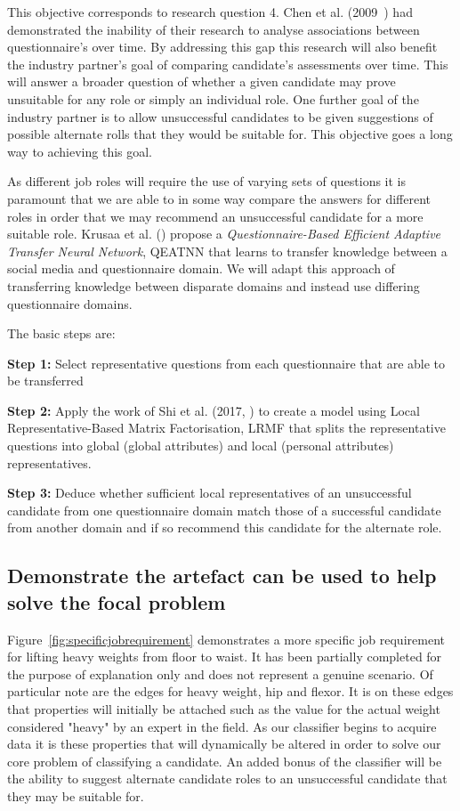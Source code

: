 This objective corresponds to research question 4. Chen et al. (2009~\cite{chen2009mining}) had demonstrated the inability of their research to analyse associations between questionnaire's over time. By addressing this gap this research will also benefit the industry partner's goal of comparing candidate's assessments over time. This will answer a broader question of whether a given candidate may prove unsuitable for any role or simply an individual role. One further goal of the industry partner is to allow unsuccessful candidates to be given suggestions of possible alternate rolls that they would be suitable for. This objective goes a long way to achieving this goal.

As different job roles will require the use of varying sets of questions it is paramount that we are able to in some way compare the answers for different roles in order that we may recommend an unsuccessful candidate for a more suitable role. Krusaa et al. (\cite{krusaatransfer}) propose a \textit{Questionnaire-Based Efficient Adaptive Transfer Neural Network}, QEATNN that learns to transfer knowledge between a social media and questionnaire domain. We will adapt this approach of transferring knowledge between disparate domains and instead use differing questionnaire domains.

The basic steps are:

\noindent
\textbf{Step 1:} Select representative questions from each questionnaire that are able to be transferred

\noindent
\textbf{Step 2:} Apply the work of Shi et al. (2017, \cite{shi2017local}) to create a model using Local Representative-Based
Matrix Factorisation, LRMF that splits the representative questions into global (global attributes) and local (personal attributes) representatives.

\noindent
\textbf{Step 3:} Deduce whether sufficient local representatives of an unsuccessful candidate from one questionnaire domain match those of a successful candidate from another domain and if so recommend this candidate for the alternate role.

\subsection{Demonstrate the artefact can be used to help solve the focal problem}

Figure~\ref{fig:specificjobrequirement} demonstrates a more specific job requirement for lifting heavy weights from floor
to waist. It has been partially completed for the purpose of explanation only and does not represent a genuine scenario.
Of particular note are the edges for heavy weight,
hip and flexor. It is on these edges that properties will initially be attached such as the value for the actual weight
considered "heavy" by an expert in the field. As our classifier begins to acquire data it is these properties that will
dynamically be altered in order to solve our core problem of classifying a candidate. An added bonus of the classifier
will be the ability to suggest alternate candidate roles to an unsuccessful candidate that they may be suitable for.

